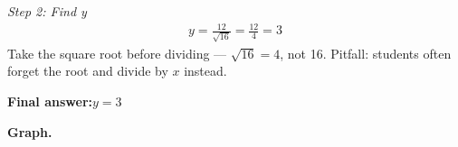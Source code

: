 \documentclass[11pt]{article}
\begin{document}
\textit{Step 2: Find y}
\[\begin{gathered}
y = \frac{12}{\sqrt{16}} = \frac{12}{4} = 3
\end{gathered}\]
Take the square root before dividing --- \( \sqrt{16} = 4 \), not 16. Pitfall: students often forget the root and divide by \( x \) instead.

\begin{answerbox}
\textbf{Final answer:}\quad \(\displaystyle y = 3\)
\end{answerbox}
\textbf{Graph.}

\begin{center}
\end{center}
\end{document}
